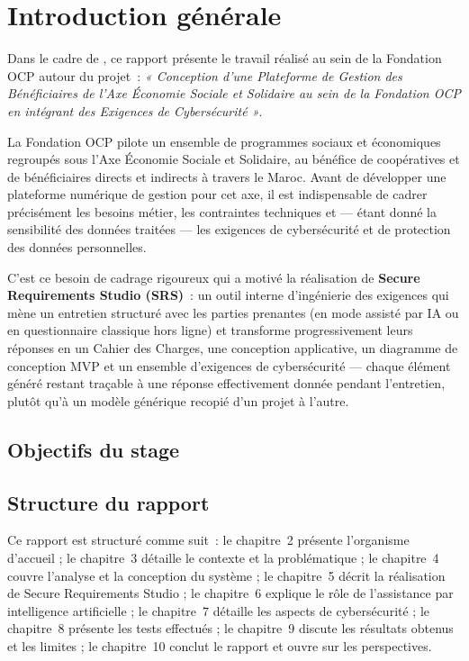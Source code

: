 \chapter{Introduction générale}

Dans le cadre de , ce rapport présente le travail réalisé au sein de la Fondation OCP autour du
projet~: \emph{« Conception d'une Plateforme de Gestion des Bénéficiaires de l'Axe
Économie Sociale et Solidaire au sein de la Fondation OCP en intégrant des Exigences de
Cybersécurité »}.

La Fondation OCP pilote un ensemble de programmes sociaux et économiques regroupés sous
l'Axe Économie Sociale et Solidaire, au bénéfice de coopératives et de bénéficiaires
directs et indirects à travers le Maroc. Avant de développer une plateforme numérique de
gestion pour cet axe, il est indispensable de cadrer précisément les besoins métier, les
contraintes techniques et — étant donné la sensibilité des données traitées — les
exigences de cybersécurité et de protection des données personnelles.

C'est ce besoin de cadrage rigoureux qui a motivé la réalisation de
\textbf{Secure Requirements Studio (SRS)}~: un outil interne d'ingénierie des exigences
qui mène un entretien structuré avec les parties prenantes (en mode assisté par IA ou en
questionnaire classique hors ligne) et transforme progressivement leurs réponses en un
Cahier des Charges, une conception applicative, un diagramme de conception MVP et un
ensemble d'exigences de cybersécurité — chaque élément généré restant traçable à une
réponse effectivement donnée pendant l'entretien, plutôt qu'à un modèle générique
recopié d'un projet à l'autre.

\section{Objectifs du stage}

\section{Structure du rapport}
Ce rapport est structuré comme suit~: le chapitre~2 présente l'organisme d'accueil ; le
chapitre~3 détaille le contexte et la problématique ; le chapitre~4 couvre l'analyse et
la conception du système ; le chapitre~5 décrit la réalisation de Secure Requirements
Studio ; le chapitre~6 explique le rôle de l'assistance par intelligence artificielle ;
le chapitre~7 détaille les aspects de cybersécurité ; le chapitre~8 présente les tests
effectués ; le chapitre~9 discute les résultats obtenus et les limites ; le chapitre~10
conclut le rapport et ouvre sur les perspectives.
